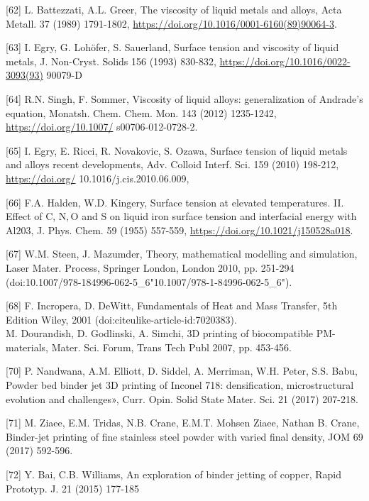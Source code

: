 \documentclass[10pt]{article}
\begin{document}
[62] L. Battezzati, A.L. Greer, The viscosity of liquid metals and alloys, Acta Metall. 37 (1989) 1791-1802, \href{https://doi.org/10.1016/0001-6160(89)90064-3}{https://doi.org/10.1016/0001-6160(89)90064-3}.

[63] I. Egry, G. Lohöfer, S. Sauerland, Surface tension and viscosity of liquid metals, J. Non-Cryst. Solids 156 (1993) 830-832, \href{https://doi.org/10.1016/0022-3093(93)}{https://doi.org/10.1016/0022-3093(93)} 90079-D

[64] R.N. Singh, F. Sommer, Viscosity of liquid alloys: generalization of Andrade's equation, Monatsh. Chem. Chem. Mon. 143 (2012) 1235-1242, \href{https://doi.org/10.1007/}{https://doi.org/10.1007/} s00706-012-0728-2.

[65] I. Egry, E. Ricci, R. Novakovic, S. Ozawa, Surface tension of liquid metals and alloys recent developments, Adv. Colloid Interf. Sci. 159 (2010) 198-212, \href{https://doi.org/}{https://doi.org/} 10.1016/j.cis.2010.06.009,

[66] F.A. Halden, W.D. Kingery, Surface tension at elevated temperatures. II. Effect of C, $\mathrm{N}, \mathrm{O}$ and $\mathrm{S}$ on liquid iron surface tension and interfacial energy with $\mathrm{Al203}$, J. Phys. Chem. 59 (1955) 557-559, \href{https://doi.org/10.1021/j150528a018}{https://doi.org/10.1021/j150528a018}.

[67] W.M. Steen, J. Mazumder, Theory, mathematical modelling and simulation, Laser Mater. Process, Springer London, London 2010, pp. 251-294 (doi:10.1007/978-184996-062-5\_6"10.1007/978-1-84996-062-5\_6").

[68] F. Incropera, D. DeWitt, Fundamentals of Heat and Mass Transfer, 5th Edition Wiley, 2001 (doi:citeulike-article-id:7020383).\\
[69] M. Dourandish, D. Godlinski, A. Simchi, 3D printing of biocompatible PM-materials, Mater. Sci. Forum, Trans Tech Publ 2007, pp. 453-456.

[70] P. Nandwana, A.M. Elliott, D. Siddel, A. Merriman, W.H. Peter, S.S. Babu, Powder bed binder jet 3D printing of Inconel 718: densification, microstructural evolution and challenges», Curr. Opin. Solid State Mater. Sci. 21 (2017) 207-218.

[71] M. Ziaee, E.M. Tridas, N.B. Crane, E.M.T. Mohsen Ziaee, Nathan B. Crane, Binder-jet printing of fine stainless steel powder with varied final density, JOM 69 (2017) 592-596.

[72] Y. Bai, C.B. Williams, An exploration of binder jetting of copper, Rapid Prototyp. J. 21 (2015) 177-185
\end{document}
